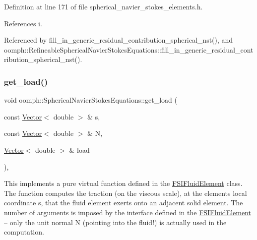 Definition at line 171 of file spherical\+\_\+navier\+\_\+stokes\+\_\+elements.\+h.



References i.



Referenced by fill\+\_\+in\+\_\+generic\+\_\+residual\+\_\+contribution\+\_\+spherical\+\_\+nst(), and oomph\+::\+Refineable\+Spherical\+Navier\+Stokes\+Equations\+::fill\+\_\+in\+\_\+generic\+\_\+residual\+\_\+contribution\+\_\+spherical\+\_\+nst().

\mbox{\label{classoomph_1_1SphericalNavierStokesEquations_aedb2bcbc50b05bf623ef544e5ed3bbbf}} 
\subsubsection{\texorpdfstring{get\+\_\+load()}{get\_load()}}
{\footnotesize\ttfamily void oomph\+::\+Spherical\+Navier\+Stokes\+Equations\+::get\+\_\+load (\begin{DoxyParamCaption}\item[{const \hyperlink{classoomph_1_1Vector}{Vector}$<$ double $>$ \&}]{s,  }\item[{const \hyperlink{classoomph_1_1Vector}{Vector}$<$ double $>$ \&}]{N,  }\item[{\hyperlink{classoomph_1_1Vector}{Vector}$<$ double $>$ \&}]{load }\end{DoxyParamCaption})\hspace{0.3cm}{\ttfamily [inline]}, {\ttfamily [virtual]}}



This implements a pure virtual function defined in the \hyperlink{classoomph_1_1FSIFluidElement}{F\+S\+I\+Fluid\+Element} class. The function computes the traction (on the viscous scale), at the element\textquotesingle{}s local coordinate s, that the fluid element exerts onto an adjacent solid element. The number of arguments is imposed by the interface defined in the \hyperlink{classoomph_1_1FSIFluidElement}{F\+S\+I\+Fluid\+Element} -- only the unit normal N (pointing into the fluid!) is actually used in the computation. 



